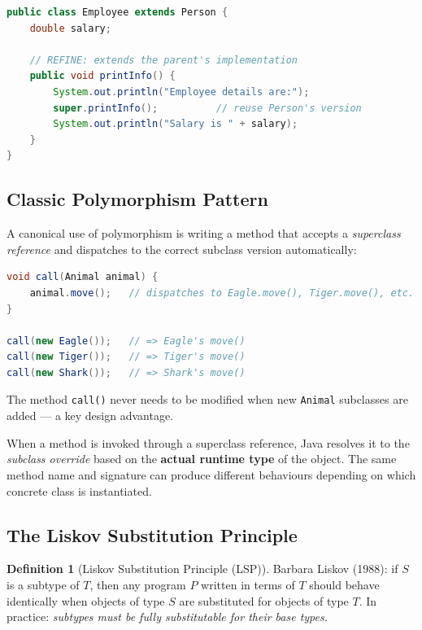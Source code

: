 \documentclass[11pt, a4paper, notitlepage]{report}
\theoremstyle{definition}
\newtheorem{definition}[theorem]{Definition}
\theoremstyle{remark}
\theoremstyle{definition}
\begin{document}
\begin{lstlisting}[language=Java, caption={Refine: \texttt{printInfo()} in \texttt{Employee} calls \texttt{super} and adds extra output.}]
public class Employee extends Person {
    double salary;

    // REFINE: extends the parent's implementation
    public void printInfo() {
        System.out.println("Employee details are:");
        super.printInfo();          // reuse Person's version
        System.out.println("Salary is " + salary);
    }
}
\end{lstlisting}

\subsection{Classic Polymorphism Pattern}
\label{sec:ch5-classic-pattern}

A canonical use of polymorphism is writing a method that accepts a \emph{superclass reference} and dispatches to the correct subclass version automatically:

\begin{lstlisting}[language=Java, caption={A single \texttt{call()} method handles any \texttt{Animal} subclass.}]
void call(Animal animal) {
    animal.move();   // dispatches to Eagle.move(), Tiger.move(), etc.
}

call(new Eagle());   // => Eagle's move()
call(new Tiger());   // => Tiger's move()
call(new Shark());   // => Shark's move()
\end{lstlisting}

The method \texttt{call()} never needs to be modified when new \texttt{Animal} subclasses are added --- a key design advantage.

\begin{keyresult}[title={Key Result: Polymorphism}]
When a method is invoked through a superclass reference, Java resolves it to the \emph{subclass override} based on the \textbf{actual runtime type} of the object.  The same method name and signature can produce different behaviours depending on which concrete class is instantiated.
\end{keyresult}

\subsection{The Liskov Substitution Principle}
\label{sec:ch5-liskov}

\begin{definition}[Liskov Substitution Principle (LSP)]
\label{def:ch5-lsp}
Barbara Liskov (1988): if $S$ is a subtype of $T$, then any program $P$ written in terms of $T$ should behave identically when objects of type $S$ are substituted for objects of type $T$.  In practice: \emph{subtypes must be fully substitutable for their base types.}
\end{definition}
\end{document}
